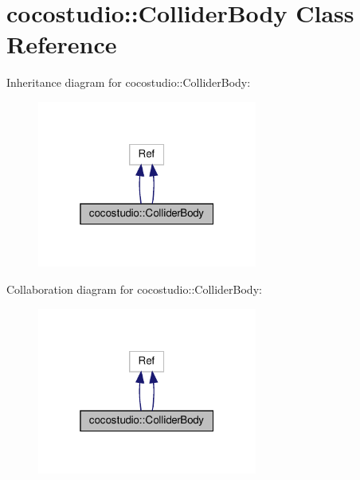 \hypertarget{classcocostudio_1_1ColliderBody}{}\section{cocostudio\+:\+:Collider\+Body Class Reference}
\label{classcocostudio_1_1ColliderBody}


Inheritance diagram for cocostudio\+:\+:Collider\+Body\+:
\nopagebreak
\begin{figure}[H]
\begin{center}
\leavevmode
\includegraphics[width=205pt]{classcocostudio_1_1ColliderBody__inherit__graph}
\end{center}
\end{figure}


Collaboration diagram for cocostudio\+:\+:Collider\+Body\+:
\nopagebreak
\begin{figure}[H]
\begin{center}
\leavevmode
\includegraphics[width=205pt]{classcocostudio_1_1ColliderBody__coll__graph}
\end{center}
\end{figure}
